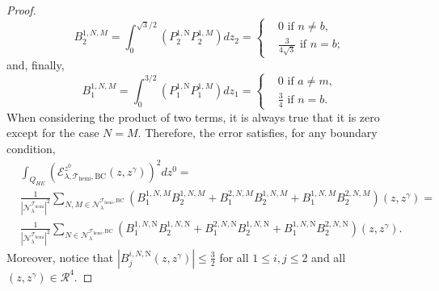 \documentclass{amsart}
\theoremstyle{definition}
\theoremstyle{remark}
\renewcommand\leq\leqslant
\numberwithin{equation}{section}
\theoremstyle{definition}
\theoremstyle{remark}
\begin{document}
\begin{proof}
	\begin{equation}
		B_2^{1,N,M}=	\int_0^{\sqrt{3}/2}\left(P^{1,\mathrm{N}}_2P^{1,M}_2\right)dz_2=\left\{\begin{aligned}
			& 0\text{ if }n\neq b,\\
			&\frac{3}{4\sqrt{3}}\text{ if }n=b;
		\end{aligned}\right.
	\end{equation}and, finally, 
	\begin{equation}
		B_1^{1,N,M}=	\int_0^{3/2}\left(P^{1,\mathrm{N}}_1P^{1,M}_1\right)dz_1=\left\{\begin{aligned}
			& 0\text{ if }a\neq m,\\
			&\frac{3}{4}\text{ if }n=b.
		\end{aligned}\right.
	\end{equation}When considering the product of two terms, it is always true that it is zero except for the case $N=M$. Therefore, the error satisfies, for any boundary condition,
	\begin{equation}
		\begin{aligned}
			&\int_{Q_{HE}}\left(\mathcal{E}_{\lambda,\mathcal{T}_\mathrm{hemi},\mathrm{BC}}^{z^0}(z,z^\gamma)\right)^2dz^0=\\&\frac{1}{\left|\mathcal{N}_\lambda^{\mathcal{T}_\mathrm{hemi}}\right|^2}\sum_{N,M\in\mathcal{N}_\lambda^{\mathcal{T}_\mathrm{hemi},\mathrm{BC}}}\left(B_1^{1,N,M}B_2^{1,N,M}+B_1^{2,N,M}B_2^{1,N,M}+B_1^{1,N,M}B_2^{2,N,M}\right)(z,z^\gamma)=\\&\frac{1}{\left|\mathcal{N}_\lambda^{\mathcal{T}_\mathrm{hemi}}\right|^2}\sum_{N\in\mathcal{N}_\lambda^{\mathcal{T}_\mathrm{hemi},\mathrm{BC}}}\left(B_1^{1,N,\mathrm{N}}B_2^{1,N,\mathrm{N}}+B_1^{2,N,\mathrm{N}}B_2^{1,N,\mathrm{N}}+B_1^{1,N,\mathrm{N}}B_2^{2,N,\mathrm{N}}\right)(z,z^\gamma).\end{aligned}\end{equation}
	Moreover, notice that $\left|B_j^{i,N,\mathrm{N}}(z,z^\gamma)\right|\leq \frac{3}{2}$ for all $1\leq i,j \leq 2$ and all $(z,z^\gamma)\in\mathcal{R}^4$.
	

\end{proof}
\end{document}
